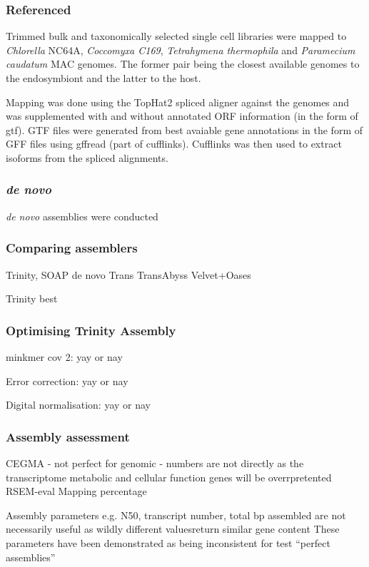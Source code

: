 \subsubsection{Referenced}

Trimmed bulk and taxonomically selected single cell libraries
were mapped to \textit{Chlorella} NC64A, \textit{Coccomyxa C169}, 
\textit{Tetrahymena thermophila} and \textit{Paramecium caudatum} MAC genomes.
The former pair being the closest available genomes to the endosymbiont and the latter to the host.

Mapping was done using the TopHat2 spliced aligner \citep{Kim2013} against
the genomes and was supplemented with and without annotated ORF information (in the form of gtf).
GTF files were generated from best avaiable gene annotations in the form of GFF files using gffread (part of
cufflinks).
Cufflinks \citep{Trapnell2011} was then used to extract isoforms from the spliced alignments.


\subsubsection{\textit{de novo}}

\textit{de novo} assemblies were conducted 




\subsubsection{Comparing assemblers}
Trinity,
SOAP de novo Trans
TransAbyss
Velvet+Oases

Trinity best

\subsubsection{Optimising Trinity Assembly}

minkmer cov 2: yay or nay

Error correction: yay or nay

Digital normalisation: yay or nay

\subsubsection{Assembly assessment}
CEGMA - not perfect for genomic - numbers are not directly as the transcriptome metabolic and cellular function
genes will be overrpretented 
RSEM-eval
Mapping percentage


Assembly parameters e.g. N50, transcript number, total bp assembled are not necessarily useful
as wildly different valuesreturn similar gene content \citep{Lowe2014}
These parameters have been demonstrated as being inconsistent for test ``perfect assemblies'' 





